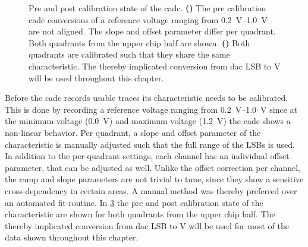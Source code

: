 \begin{figure}[htb!]
	\begin{subfigure}{0.65\textwidth}
		\caption{}
		\vspace{-0.4cm}
		
		\label{precadccalib}
		\vspace{0.4cm}
	\end{subfigure}
	\begin{subfigure}{0.35\textwidth}
		\caption{}
		
		\label{postcadccalib}
	\end{subfigure}
	\caption[Pre and post calibration state of the \gls{cadc}.]{Pre and post calibration state of the \gls{cadc}. \textbf{()} The pre calibration \gls{cadc} conversions of a reference voltage ranging from \SIrange{0.2}{1.0}{\V} are not aligned. The slope and offset parameter differ per quadrant. Both quadrants from the upper chip half are shown. \textbf{()} Both quadrants are calibrated such that they share the same characteristic. The thereby implicated conversion from \gls{dac} LSB to \si{\V} will be used throughout this chapter.}
	\label{cadccalibration}
\end{figure}
Before the \gls{cadc} records usable traces its characteristic needs to be calibrated. This is done by recording a reference voltage ranging from \SIrange{0.2}{1.0}{\V} since at the minimum voltage (\SI{0.0}{\V}) and maximum voltage (\SI{1.2}{\V}) the \gls{cadc} shows a non-linear behavior. Per quadrant, a slope and offset parameter of the characteristic is manually adjusted such that the full range of the LSBs is used. In addition to the per-quadrant settings, each channel has an individual offset parameter, that can be adjusted as well. Unlike the offset correction per channel, the ramp and slope parameters are not trivial to tune, since they show a sensitive cross-dependency in certain areas. A manual method was thereby preferred over an automated fit-routine. In \cref{cadccalibration} the pre and post calibration state of the characteristic are shown for both quadrants from the upper chip half. The thereby implicated conversion from \gls{dac} LSB to \si{\V} will be used for most of the data shown throughout this chapter.

